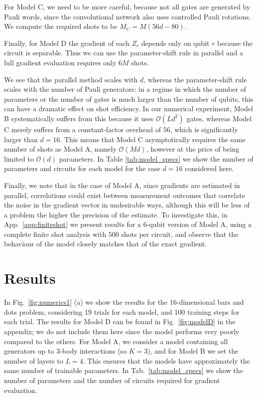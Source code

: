 \documentclass[a4paper,twocolumn,11pt,accepted=2025-09-06]{quantumarticle}
\begin{document}
For Model C, we need to be more careful, because not all gates are generated by Pauli words, since the convolutional network also uses controlled Pauli rotations. We compute the required shots to be $M_C = M(56d-80)$.

Finally, for Model D the gradient of each $Z_r$ depends only on qubit $r$ because the circuit is separable. Thus we can use the parameter-shift rule in parallel and a full gradient evaluation requires only $6M$ shots.

We see that the parallel method scales with $d$, whereas the parameter-shift rule scales with the number of Pauli generators: in a regime in which the number of parameters or the number of gates is much larger than the number of qubits, this can have a dramatic effect on shot efficiency. In our numerical experiment, Model B systematically suffers from this because it uses $\mathcal{O}(Ld^2)$ gates, whereas Model C merely suffers from a constant-factor overhead of $56$, which is significantly larger than $d=16$.
This means that Model C asymptotically requires the same number of shots as Model A, namely $\mathcal{O}(Md)$, however at the price of being limited to $\mathcal{O}(d)$ parameters. In Table \ref{tab:model_specs} we show the number of parameters and circuits for each model for the case $d=16$ considered here. 

Finally, we note that in the case of Model A, since gradients are estimated in parallel, correlations could exist between measurement outcomes that correlate the noise in the gradient vector in undesirable ways, although this will be less of a problem the higher the precision of the estimate. To investigate this, in App.\ \ref{app:finiteshot} we present results for a 6-qubit version of Model A, using a complete finite shot analysis with $500$ shots per circuit, and observe that the behaviour of the model closely matches that of the exact gradient.

\section{Results}

In Fig.\ \ref{fig:numerics1} (a) we show the results for the 16-dimensional bars and dots problem, considering 19 trials for each model, and 100 training steps for each trial.
The results for Model D can be found in Fig.\ \ref{fig:modelD} in the appendix; we do not include them here since the model performs very poorly compared to the others. 
For Model A, we consider a model containing all generators up to $3$-body interactions (so $K=3$), and for Model B we set the number of layers to $L=4$. This ensures that the models have approximately the same number of trainable parameters. In Tab.\ \ref{tab:model_specs} we show the number of parameters and the number of circuits required for gradient evaluation.
\end{document}
